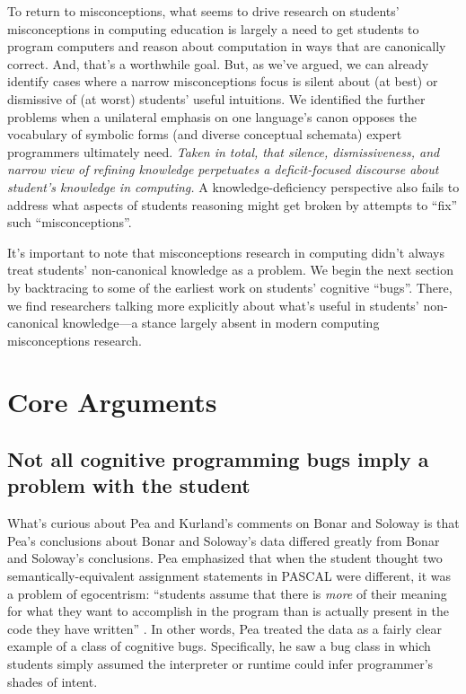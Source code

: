 To return to misconceptions, what seems to drive research on students'
misconceptions in computing education is largely a need to get students to program computers
and reason about computation in ways that are canonically correct. And,
that's a worthwhile goal. But, as we've argued, we can
already identify cases where a narrow misconceptions focus is silent
about (at best) or dismissive of (at worst) students' useful intuitions. We identified
the further problems when a unilateral emphasis on one language's canon
opposes the vocabulary of symbolic forms (and diverse conceptual
schemata) expert programmers ultimately need. \emph{Taken in
total, that silence, dismissiveness, and narrow view of refining
knowledge perpetuates a deficit-focused discourse about student's
knowledge in computing.} A knowledge-deficiency perspective also fails to address what aspects of
students reasoning might get broken by attempts to ``fix'' such
``misconceptions''.

It's important to note that misconceptions research in computing didn't
always treat students' non-canonical knowledge as a problem. We begin the
next section by backtracing to some of the earliest work on students'
cognitive ``bugs''. There, we find researchers talking more explicitly
about what's useful in students' non-canonical knowledge---a stance
largely absent in modern computing misconceptions research.

\section{Core Arguments}\label{core-arguments}

\subsection{Not all cognitive programming bugs imply a problem with
the
student}\label{not-all-cognitive-programming-bugs-imply-a-problem-with-the-student}

What's curious about Pea and Kurland's \cite{pea_languageindependent_1986} comments on Bonar and Soloway \cite{bonar_uncovering_1983} is
that Pea's conclusions \cite{pea_languageindependent_1986} about Bonar and Soloway's data differed greatly from Bonar and Soloway's conclusions. Pea emphasized that when the student thought two
semantically-equivalent assignment statements in PASCAL were different,
it was a problem of egocentrism: ``students assume that there is
\emph{more} of their meaning for what they want to accomplish in the
program than is actually present in the code they have written'' \cite{pea_languageindependent_1986}. In other words, Pea treated the data as a fairly clear example of a
class of cognitive bugs. Specifically, he saw a bug class in which students simply
assumed the interpreter or runtime could infer programmer's shades
of intent.

